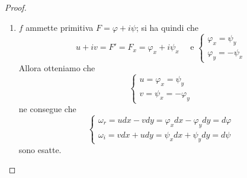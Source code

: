 \begin{proof} \( \) 
\begin{enumerate}[label = \alph*)]
    \item \(f\) ammette primitiva \(F = \varphi + i \psi\); si ha quindi che 
        \[
            u+ iv = F' = F_x = \varphi_x + i \psi_x \quad \text{ e }
            \begin{cases}
                \varphi_x = \psi_y \\
                \varphi_y = -\psi_x
            \end{cases}
        \]
        Allora otteniamo che 
        \[
            \begin{cases}
                u = \varphi_x = \psi_y \\
                v = \psi_x = -\varphi_y
            \end{cases}
        \]
        ne consegue che 
        \[
            \begin{cases}
                \omega_r = udx - vdy = \varphi_x dx - \varphi_y dy = d\varphi \\
                \omega_i = vdx + udy = \psi_x dx + \psi_y dy = d\psi
            \end{cases}
        \]
        sono esatte.


\end{enumerate}
\end{proof}
